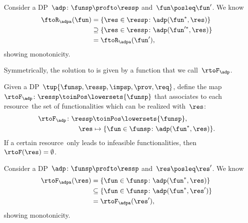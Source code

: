 \begin{remark}[Monotonicity]
    Consider a DP~$\adp\colon\funsp\profto\ressp$ and~$\fun\posleq \fun'$. We know
    \begin{equation*}
        \begin{aligned}
            \ftoR_\adpa(\fun)&=\{ \res \in \ressp \colon \adp(\fun^*, \res)\} \\
            &\supseteq \{ \res \in \ressp \colon \adp(\fun'^*, \res)\}\\
            &=\ftoR_\adpa(\fun'),
        \end{aligned}
    \end{equation*}
    showing monotonicity.
\end{remark}


Symmetrically, the solution to \FixResMaxFun is given by a function that we call~$\rtoF_\adp$.

\begin{definition}
    \label{def:rtoF-dp}
    Given a DP~$\tup{ \funsp,\ressp,\impsp,\prov,\req}$,
    define the map~$\rtoF_{\adp}\colon \ressp\toinPos  \lowersets{\funsp}$ that associates
    to each resource~\res the set of functionalities which can be realized with~$\res$:
    \begin{equation*}
        \begin{aligned}
        \rtoF_{\adp}\colon \ressp & \toinPos \lowersets{\funsp},\\
        \res& \mapsto \{ \fun \in \funsp \colon \adp(\fun^*, \res)\}.
        \end{aligned}
    \end{equation*}
    If a certain resource~\res only leads to infeasible functionalities, then~$\rtoF(\res)=\emptyset$.
\end{definition}

\begin{remark}[Monotonicity]
    Consider a DP~$\adp\colon\funsp\profto\ressp$ and~$\res\posleq \res'$. We know
    \begin{equation*}
        \begin{aligned}
            \rtoF_\adpa(\res)&=\{ \fun \in \funsp \colon \adp(\fun^*, \res)\} \\
            &\subseteq \{ \fun \in \funsp \colon \adp(\fun^*, \res')\}\\
            &=\rtoF_\adpa(\res'),
        \end{aligned}
    \end{equation*}
    showing monotonicity.
\end{remark}

